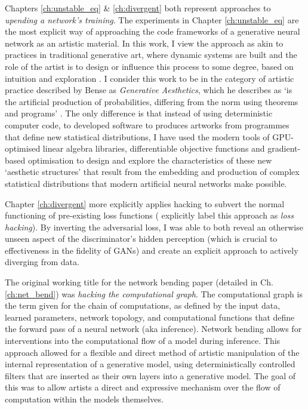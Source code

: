 Chapters \ref{ch:unstable_eq} \& \ref{ch:divergent} both represent approaches to \textit{upending a network's training}. 
The experiments in Chapter \ref{ch:unstable_eq} are the most explicit way of approaching the code frameworks of a generative neural network as an artistic material.
In this work, I view the approach as akin to practices in traditional generative art, where dynamic systems are built and the role of the artist is to design or influence this process to some degree, based on intuition and exploration \cite{mccormack2004generative}.
I consider this work to be in the category of artistic practice described by Bense as \textit{Generative Aesthetics}, which he describes as `is the artificial production of probabilities, differing from the norm using theorems and programs' \citep{bense1965projekte}.
The only difference is that instead of using deterministic computer code, to developed software to produces artworks from programmes that define new statistical distributions, I have used the modern tools of GPU-optimised linear algebra libraries, differentiable objective functions and gradient-based optimisation to design and explore the characteristics of these new `aesthetic structures' \citep{bense1965projekte} that result from the embedding and production of complex statistical distributions that modern artificial neural networks make possible.

Chapter \ref{ch:divergent} more explicitly applies hacking to subvert the normal functioning of pre-existing loss functions (\cite{berns2020bridging} explicitly label this approach as \textit{loss hacking}).
By inverting the adversarial loss, I was able to both reveal an otherwise unseen aspect of the discriminator's hidden perception (which is crucial to effectiveness in the fidelity of GANs) and create an explicit approach to actively diverging from data.

The original working title for the network bending paper (detailed in Ch. \ref{ch:net_bend}) was \textit{hacking the computational graph}.
The computational graph is the term given for the chain of computations, as defined by the input data, learned parameters, network topology, and computational functions that define the forward pass of a neural network (aka inference). Network bending allows for interventions into the computational flow of a model during inference. 
This approach allowed for a flexible and direct method of artistic manipulation of the internal representation of a generative model, using deterministically controlled filters that are inserted as their own layers into a generative model.
The goal of this was to allow artists a direct and expressive mechanism over the flow of computation within the models themselves.


